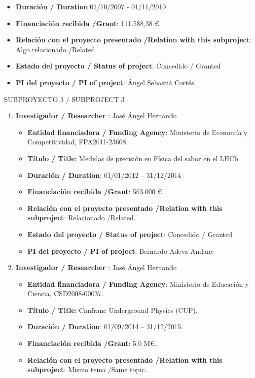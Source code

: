 \begin{enumerate}
\begin{itemize}
\item {\bf Duración / Duration}:01/10/2007 - 01/11/2010 
\item {\bf Financiación recibida /Grant}: 111.588,38 \euro. 
\item {\bf Relación con el proyecto presentado /Relation with this subproject}: Algo relacionado /Related. 
\item {\bf Estado del proyecto / Status of project}: Concedido / Granted
\item {\bf PI del proyecto / PI of project}: Ángel Sebastiá Cortés 
\end{itemize}
\end{enumerate}


{\sc SUBPROYECTO 3 / SUBPROJECT 3}

\begin{enumerate}
\item {\bf Investigador / Researcher }: José Ángel Hernando
\begin{itemize}
\item {\bf Entidad financiadora / Funding Agency}: Ministerio de Econom\'ia y Competitividad, FPA2011-23608.  
\item {\bf Título / Title}:  Medidas de precisi\'on en F\'isica del sabor en el LHCb
\item {\bf Duración / Duration}: 01/01/2012 -- 31/12/2014
\item {\bf Financiación recibida /Grant}: 563.000 \euro 
\item {\bf Relación con el proyecto presentado /Relation with this subproject}: Relacionado /Related. 
\item {\bf Estado del proyecto / Status of project}: Concedido / Granted
\item {\bf PI del proyecto / PI of project}: Bernardo Adeva Andany
\end{itemize}
\item {\bf Investigador / Researcher }: José Ángel Hernando
\begin{itemize}
\item {\bf Entidad financiadora / Funding Agency}: Ministerio de Educaci\'on y Ciencia, CSD2008-00037.
\item {\bf Título / Title}:  Canfranc Underground Physics (CUP).
\item {\bf Duración / Duration}: 01/09/2014 -- 31/12/2015. 
\item {\bf Financiación recibida /Grant}: 5.0 M\euro. 
\item {\bf Relación con el proyecto presentado /Relation with this subproject}: Mismo tema /Same topic. 

\end{itemize}
\end{enumerate}
